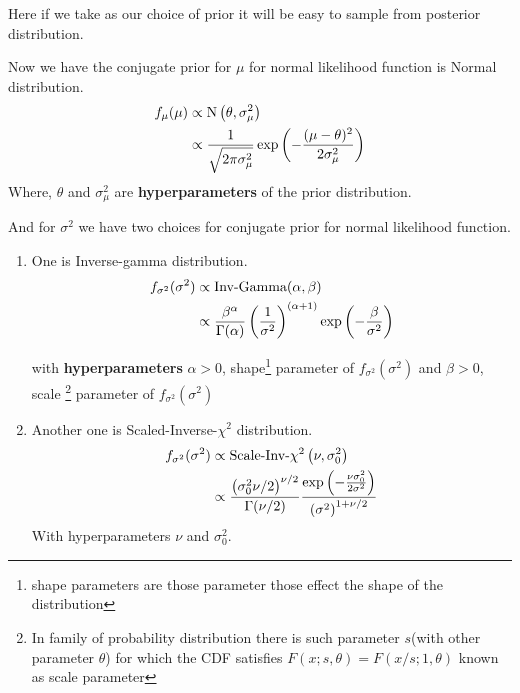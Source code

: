 \begin{example}
     Here if we take  as our choice of prior it will be easy to sample from posterior distribution.

     Now we have the conjugate prior for $ \mu $ for normal likelihood function is Normal distribution.
     \begin{align*}
         f_{\mu} (\mu) &\propto \text{N}\left( \theta,\sigma_{\mu}^{2}  \right) \\
                       &\propto \frac{ 1 }{ \sqrt{2 \pi \sigma_{\mu} ^{2} } } \exp \left( - \frac{ (\mu - \theta)^{2} }{ 2 \sigma_{\mu} ^{2}  } \right)
     \end{align*}
     Where, $ \theta $ and $ \sigma_{\mu}^{2} $ are \textbf{hyperparameters} of the prior distribution. 

     And for $ \sigma^2 $ we have two choices for conjugate prior for normal likelihood function.
     \begin{enumerate}
         \item One is Inverse-gamma distribution.
             \begin{align*}
                 f_{\sigma^2}(\sigma ^{2}) &\propto \text{Inv-Gamma}(\alpha,\beta) \\
                              &\propto \frac{ \beta^{\alpha}  }{ \Gamma(\alpha) } \left( \frac{ 1 }{ \sigma^2 } \right)^{(\alpha+1)} \exp \left( - \frac{ \beta }{ \sigma ^{2}  } \right)
             \end{align*}

             with \textbf{hyperparameters} $ \alpha > 0 $, shape\footnote{shape parameters are those parameter those effect the shape of the distribution} parameter of $ f_{\sigma ^{2}}(\sigma ^{2})  $ and $ \beta > 0 $, scale \footnote{ In family of probability distribution there is such parameter $ s $(with other parameter $ \theta $) for which the CDF satisfies $F(x;s,\theta) = F(x/s;1,\theta)$ known as scale parameter} parameter of $ f_{\sigma ^{2}}(\sigma ^{2})  $

        \item Another one is Scaled-Inverse-$\chi ^{2}$ distribution.
            \begin{align*}
                f_{\sigma ^{2} }(\sigma ^{2}) &\propto \text{Scale-Inv-}\chi^2\left( \nu,\sigma ^{2}_0 \right)\\ 
                                              &\propto \frac{ \left( \sigma_{0}^{2}\nu/2 \right)^{\nu/2}   }{ \Gamma(\nu/2) } \frac{ \exp\left( - \frac{ \nu \sigma_0 ^{2} }{ 2 \sigma ^{2} } \right) }{ \left( \sigma^2 \right)^{1+\nu/2}  }
            \end{align*}
            With hyperparameters $ \nu $ and $ \sigma_0 ^{2} $.
     \end{enumerate}


\end{example}
